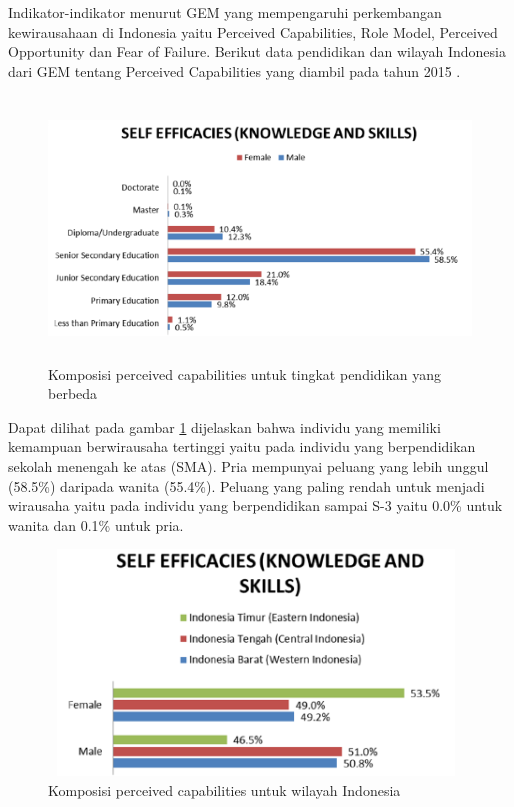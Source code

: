 Indikator-indikator menurut GEM yang mempengaruhi perkembangan kewirausahaan di Indonesia yaitu Perceived Capabilities, Role Model, Perceived Opportunity dan Fear of Failure. Berikut data pendidikan dan wilayah Indonesia dari GEM tentang Perceived Capabilities yang diambil pada tahun 2015 \cite{dataGEM}.


\begin{figure} [H]
	\centering  
	\includegraphics[width=14cm, height=7cm]{PCPendidikan} 
	\caption[Komposisi perceived capabilities untuk tingkat pendidikan yang berbeda]{Komposisi perceived capabilities untuk tingkat pendidikan yang berbeda} 
	\label{fig:PCPendidikan} 
\end{figure}

Dapat dilihat pada gambar \ref{fig:PCPendidikan} dijelaskan bahwa individu yang memiliki kemampuan berwirausaha tertinggi yaitu pada individu yang berpendidikan sekolah menengah ke atas (SMA). Pria mempunyai peluang yang lebih unggul (58.5\%) daripada wanita (55.4\%). Peluang yang paling rendah untuk menjadi wirausaha yaitu pada individu yang berpendidikan sampai S-3 yaitu 0.0\% untuk wanita dan 0.1\% untuk pria. 

\begin{figure} [H]
	\centering  
	\includegraphics[width=11cm, height=6cm]{PCRegion} 
	\caption[Komposisi perceived capabilities untuk wilayah Indonesia]{Komposisi perceived capabilities untuk wilayah Indonesia} 
	\label{fig:PCRegion} 
\end{figure}

